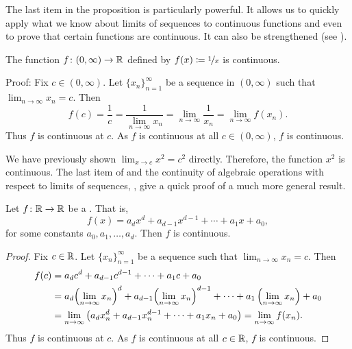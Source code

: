 The last item in the proposition is particularly powerful.  It allows us to
quickly apply what we know about limits of sequences to continuous functions
and even to prove that certain functions are continuous.
It can also be strengthened (see ).

\begin{example}
The function $f \colon (0,\infty) \to {\mathbb{R}}$
defined by $f(x) \coloneqq \nicefrac{1}{x}$ is continuous.

Proof: Fix $c \in (0,\infty)$.  
Let $\{ x_n \}_{n=1}^\infty$ be a sequence in $(0,\infty)$ such that
$\lim_{n\to\infty} x_n = c$.  Then
\begin{equation*}
f(c) = \frac{1}{c}
=
\frac{1}{\lim_{n\to\infty} x_n}
=
\lim_{n \to \infty} \frac{1}{x_n}
=
\lim_{n \to \infty} f(x_n) .
\end{equation*}
Thus $f$ is continuous at $c$.  As $f$ is continuous at all $c \in
(0,\infty)$, $f$ is continuous.
\end{example}

We have previously shown $\lim_{x \to c} x^2 = c^2$ directly.  Therefore,
the function $x^2$ is continuous.  The last item of  and the continuity of
algebraic operations with respect to limits of sequences,
, give a quick proof of a much more general result.

\begin{prop}
Let $f \colon {\mathbb{R}} \to {\mathbb{R}}$ be a \emph{}.  That is,
\begin{equation*}
f(x) = a_d x^d + a_{d-1} x^{d-1} + \cdots + a_1 x + a_0 ,
\end{equation*}
for some constants $a_0, a_1, \ldots, a_d$.
Then $f$ is continuous.
\end{prop}

\begin{proof}
Fix $c \in {\mathbb{R}}$.  
Let $\{ x_n \}_{n=1}^\infty$ be a sequence such that
$\lim_{n\to\infty} x_n = c$.  Then
\begin{equation*}
\begin{split}
f(c) &=
a_d c^d + a_{d-1} c^{d-1} + \cdots + a_1 c + a_0 
\\
&= 
a_d {\left(\lim_{n\to\infty} x_n\right)}^d
+ a_{d-1} {\left(\lim_{n\to\infty} x_n\right)}^{d-1}
+ \cdots
+ a_1 \left(\lim_{n\to\infty} x_n\right) + a_0 
\\
& =
\lim_{n \to \infty}
\left(
a_d x_n^d + a_{d-1} x_n^{d-1} + \cdots + a_1 x_n + a_0 
\right)
=
\lim_{n \to \infty}
f(x_n) .
\avoidbreak
\end{split}
\end{equation*}
Thus $f$ is continuous at $c$.  As $f$ is continuous at all $c \in {\mathbb{R}}$,
$f$ is continuous.
\end{proof}

